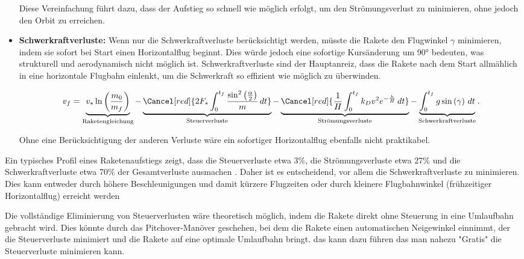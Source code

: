 \begin{itemize}
	Diese Vereinfachung führt dazu, dass der Aufstieg so schnell wie möglich erfolgt, um den Strömungsverlust zu minimieren, ohne jedoch den Orbit zu erreichen.
	
	\item \textbf{Schwerkraftverluste:} Wenn nur die Schwerkraftverluste berücksichtigt werden, müsste die Rakete den Flugwinkel \(\gamma\) minimieren, indem sie sofort bei Start einen Horizontalflug beginnt. Dies würde jedoch eine sofortige Kursänderung um 90° bedeuten, was strukturell und aerodynamisch nicht möglich ist. Schwerkraftverluste sind der Hauptanreiz, dass die Rakete nach dem Start allmählich in eine horizontale Flugbahn einlenkt, um die Schwerkraft so effizient wie möglich zu überwinden.
	
	\begin{equation*}
		v_f = \underbrace{v_* \ln \left(\frac{m_0}{m_f}\right)}_{\text{Raketengleichung}} 
		- \underbrace{\Cancel[red]{2F_* \int_0^{t_f} \frac{\sin^2\left(\frac{\alpha}{2}\right)}{m} \, dt }}_{\text{Steuerverluste}}
		- \underbrace{\Cancel[red]{\frac{1}{H} \int_0^{t_f} k_Dv^2 e^{-\frac{h}{H}} \, dt }}_{\text{Strömungsverluste}}
		- \underbrace{\int_0^{t_f} g \sin \left(\gamma\right) \, dt}_{\text{Schwerkraftverluste}}.
	\end{equation*}
	
	Ohne eine Berücksichtigung der anderen Verluste wäre ein sofortiger Horizontalflug ebenfalls nicht praktikabel.
\end{itemize}

Ein typisches Profil eines Raketenaufstiegs zeigt, dass die Steuerverluste etwa 3\%, die Strömungsverluste etwa 27\% und die Schwerkraftverluste etwa 70\% der Gesamtverluste ausmachen \cite{leo:astronautics}. Daher ist es entscheidend, vor allem die Schwerkraftverluste zu minimieren. Dies kann entweder durch höhere Beschleunigungen und damit kürzere Flugzeiten oder durch kleinere Flugbahnwinkel (frühzeitiger Horizontalflug) erreicht werden

Die vollständige Eliminierung von Steuerverlusten wäre theoretisch möglich, indem die Rakete direkt ohne Steuerung in eine Umlaufbahn gebracht wird. Dies könnte durch das Pitchover-Manöver geschehen, bei dem die Rakete einen automatischen Neigewinkel einnimmt, der die Steuerverluste minimiert und die Rakete auf eine optimale Umlaufbahn bringt. das kann dazu führen das man nahezu "Gratis" die Steuerverluste minimieren kann. 

